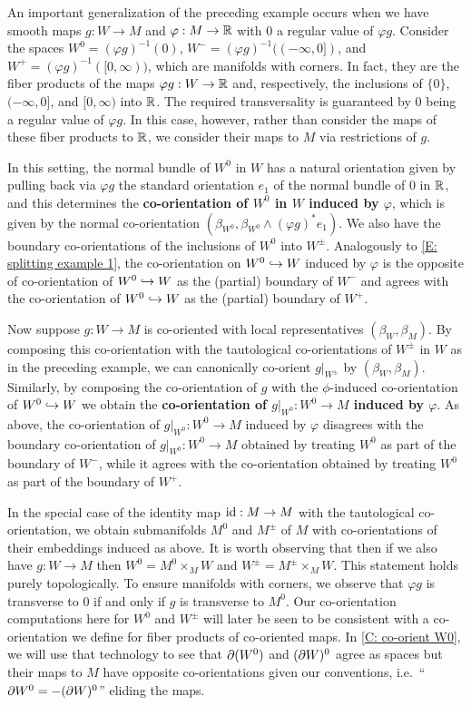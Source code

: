 \begin{example}\label{E: manifold decomposition}
An important generalization of the preceding example occurs when we have smooth maps $g:W\to M$ and $\varphi:M\to \mathbb{R}$ with $0$ a regular value of $\varphi g$. Consider the spaces $W^0=(\varphi g)^{-1}(0)$, $W^-=(\varphi g)^{-1}((-\infty,0])$, and $W^+=(\varphi g)^{-1}([0,\infty))$, which are manifolds with corners. In fact, they are the fiber products  of the maps $\varphi g:W\to \mathbb{R}$ and, respectively, the inclusions of $\{0\}$, $(-\infty, 0]$, and $[0,\infty)$ into $\mathbb{R}$. The required transversality is guaranteed by $0$ being a regular value of $\varphi g$. In this case, however, rather than consider the maps of these fiber products to $\mathbb{R}$, we consider their maps to $M$ via restrictions of $g$.

In this setting, the normal bundle of $W^0$ in $W$ has a natural  orientation given by pulling back via $\varphi g$ the standard orientation $e_1$ of the normal bundle of $0$ in $\mathbb{R}$, and this determines the \textbf{co-orientation of $W^0$ in $W$ induced by $\varphi$}, which is  given by the normal co-orientation  $(\beta_{W^0}, \beta_{W^0} \wedge(\varphi g)^*e_1)$. We also have the boundary  co-orientations of the inclusions of $W^0$ into $W^{\pm}$. Analogously to \cref{E: splitting example 1}, the co-orientation on $W^0\hookrightarrow W$ induced by $\varphi$ is the opposite of co-orientation of $W^0\hookrightarrow W$ as the (partial) boundary of $W^-$ and agrees with the co-orientation of $W^0\hookrightarrow W$ as the (partial) boundary of $W^+$.

Now suppose $g:W\to M$ is co-oriented with local representatives $(\beta_W,\beta_M)$. By composing this co-orientation with the tautological co-orientations of $W^\pm$ in $W$ as in the preceding example, we can canonically co-orient $g|_{W^\pm}$ by $(\beta_W,\beta_M)$. Similarly, by composing the co-orientation of $g$ with the $\phi$-induced co-orientation of $W^0\hookrightarrow W$  we obtain the \textbf{co-orientation of  $g|_{W^0}:W^0\to M$ induced by $\varphi$}.
As above, the co-orientation of $g|_{W^0}:W^0\to M$ induced by $\varphi$ disagrees with  the boundary co-orientation of  $g|_{W^0}:W^0\to M$ obtained by treating $W^0$ as part of the boundary of $W^-$, while it agrees with the co-orientation obtained by treating $W^0$ as part of the boundary of $W^+$.

In the special case of the identity map  $\mathrm{id}:M\to M$ with the tautological co-orientation, we obtain submanifolds $M^0$ and $M^{\pm}$ of $M$ with co-orientations of their embeddings induced as above. It is worth observing that then if we also have $g:W\to M$ then $W^0=M^0\times_M W$ and $W^{\pm}=M^{\pm}\times_M W$. This statement holds purely topologically. To ensure manifolds with corners, we observe that $\varphi g$ is transverse to $0$ if and only if $g$ is transverse to $M^0$. Our co-orientation computations here for $W^0$ and $W^\pm$ will later be seen to be consistent with a co-orientation we define for fiber products of co-oriented maps. In \cref{C: co-orient W0}, we will use that technology to see that $\partial (W^0)$ and $(\partial W)^0$ agree as spaces but their maps to $M$ have opposite co-orientations given our conventions, i.e.\  ``$\partial W^0=-(\partial W)^0$'' eliding the maps.




\end{example}
